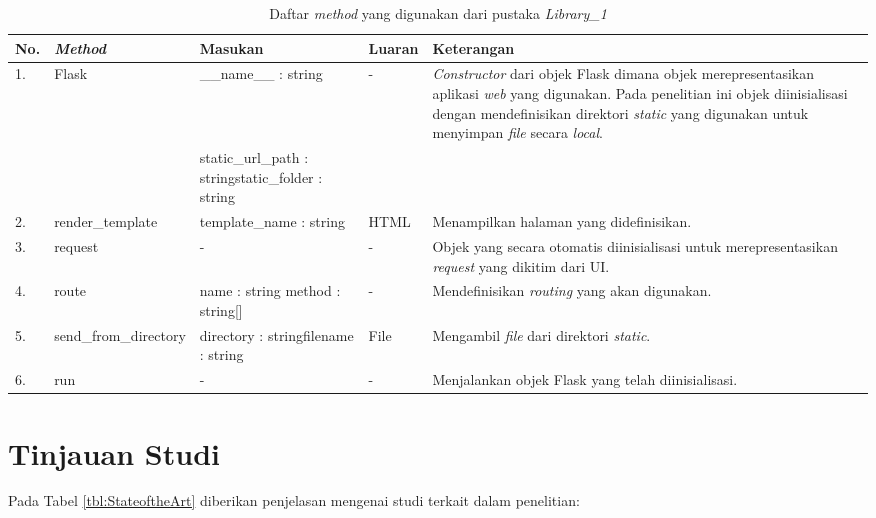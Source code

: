 \begin{small}
	\begin{longtable}[c]{|p{0.4cm}|p{3cm}|p{2.8cm}|p{1.8cm}|p{3.8cm}|}
		\caption{Daftar \textit{method} yang digunakan dari pustaka\textit{ Library\_1}}
		\label{library:Library1}\\
		\hline
		\centering \textbf{No.} &
		\centering \textbf{\textit{Method}} &
		\centering \textbf{Masukan} &
		\centering \textbf{Luaran} &
		\centering \textbf{Keterangan} \tabularnewline \hline
		\multirow{2}{*}{1.} & Flask & \_\_name\_\_ : string & - & \textit{Constructor} dari objek Flask dimana objek merepresentasikan aplikasi \textit{web} yang digunakan. Pada penelitian ini objek diinisialisasi dengan mendefinisikan direktori \textit{static} yang digunakan untuk menyimpan \textit{file} secara \textit{local}.\\
        \cline{3-3}
        & & static\_url\_path : string\newline static\_folder : string & & \\ \hline
		2. & render\_template & template\_name : string & HTML & Menampilkan halaman yang didefinisikan. \\ \hline
		3. & request & - & - & Objek yang secara otomatis diinisialisasi untuk merepresentasikan \textit{request} yang dikitim dari UI. \\ \hline
		4. & route & name : string \newline method : string[] & - & Mendefinisikan \textit{routing} yang akan digunakan. \\ \hline
		5. & send\_from\_directory & directory : string\newline filename : string & File & Mengambil \textit{file} dari direktori \textit{static}. \\ \hline
		6. & run & - & - & Menjalankan objek Flask yang telah diinisialisasi. \\ \hline
		
	\end{longtable}
\end{small}

\section{Tinjauan Studi}
\par Pada Tabel \ref{tbl:StateoftheArt} diberikan penjelasan mengenai studi terkait dalam penelitian:

